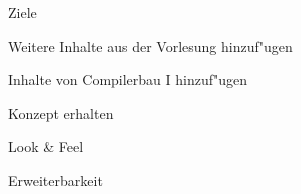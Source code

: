 {
\begin{itemgroup}{}
   \item Ziele
   \begin{itemgroup}{}
      \item Weitere Inhalte aus der Vorlesung hinzuf"ugen
      \item Inhalte von Compilerbau I hinzuf"ugen
      \item Konzept erhalten
      \begin{itemgroup}{}
         \item Look \& Feel
         \item Erweiterbarkeit
      \end{itemgroup}
   \end{itemgroup}
\end{itemgroup}

\vfill{}
}
